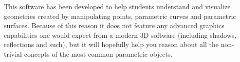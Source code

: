 \maketitle
This software has been developed to help students understand and visualize
geometries created by manipulating points, parametric curves and parametric
surfaces.
Because of this reason it does not feature any advanced graphics capabilities
one would expect from a modern 3D software (including shadows,
reflections and such), but it will hopefully help you reason
about all the non-trivial concepts of the most common parametric objects.
